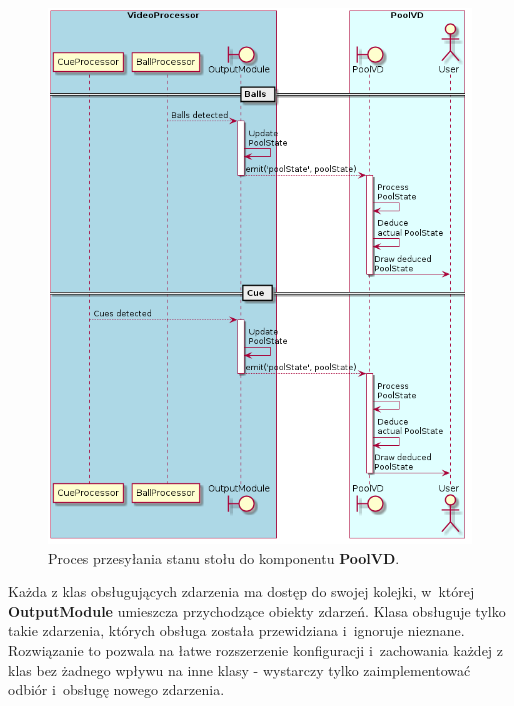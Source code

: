 \documentclass[12pt]{article}
\begin{document}
\begin{figure}[!htb]
    \centering
    \includegraphics[width=15cm]{./diagrams/out/pool_state_sd.png}
    \caption{Proces przesyłania stanu stołu do komponentu \textbf{PoolVD}.}
    \label{pool_state_sd}
\end{figure}


Każda z klas obsługujących zdarzenia ma dostęp do swojej kolejki, w~której \textbf{OutputModule} umieszcza przychodzące obiekty zdarzeń. Klasa obsługuje tylko takie zdarzenia, których obsługa została przewidziana i~ignoruje nieznane. Rozwiązanie to pozwala na łatwe rozszerzenie konfiguracji i~zachowania każdej z klas bez żadnego wpływu na inne klasy - wystarczy tylko zaimplementować odbiór i~obsługę nowego zdarzenia.
\end{document}
